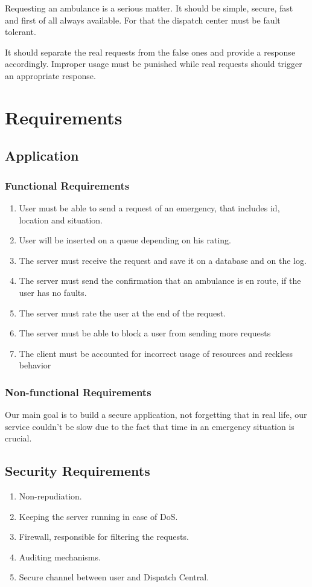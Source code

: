 \documentclass[a4paper,titlepage,11pt]{article}
\begin{document}
Requesting an ambulance is a serious matter.
It should be simple, secure, fast and first of all always available.
For that the dispatch center must be fault tolerant.

It should separate the real requests from the false ones and provide a response accordingly.
Improper usage must be punished while real requests should trigger an appropriate response.

\section{Requirements}

\subsection{Application}
\subsubsection{Functional Requirements}
\begin{enumerate}
  \item User must be able to send a request of an emergency, that includes id, location and situation.
  \item User will be inserted on a queue depending on his rating.
  \item The server must receive the request and save it on a database and on the log.
  \item The server must send the confirmation that an ambulance is en route, if the user has no faults.
  \item The server must rate the user at the end of the request.
  \item The server must be able to block a user from sending more requests                                                         %
  \item The client must be accounted for incorrect usage of resources and reckless behavior
\end{enumerate}

\subsubsection{Non-functional Requirements}
Our main goal is to build a secure application, not forgetting that in real life,
our service couldn't be slow due to the fact that time in an emergency situation is crucial.

\subsection{Security Requirements}
\begin{enumerate}
  \item Non-repudiation.
  \item Keeping the server running in case of DoS.
  \item Firewall, responsible for filtering the requests.
  \item Auditing mechanisms.
  \item Secure channel between user and Dispatch Central.
\end{enumerate}
\end{document}
